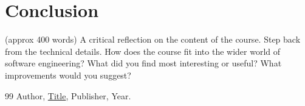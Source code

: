 \documentclass{article}
\theoremstyle{theorem}
\theoremstyle{definition}
\theoremstyle{remark}
\begin{document}
\section{Conclusion}\label{conclusion}

(approx 400 words) A critical reflection on the content of the course. Step back from the technical details. How does the course fit into the wider world of software engineering? What did you find most interesting or useful? What improvements would you suggest?

\begin{thebibliography}{99}
 Author, \href{https://en.wikipedia.org/wiki/LaTeX}{Title}, Publisher, Year.
\end{thebibliography}
\end{document}
